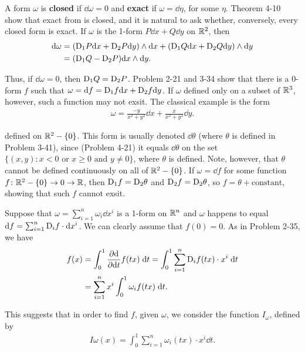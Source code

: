 A form $\omega$ is \textbf{closed} if $\dd\omega = 0$ and \textbf{exact} if $\omega=\dd\eta$,
for some $\eta$. Theorem 4-10 show that exact from is closed, and it is natural to ask whether,
conversely, every closed form is exact. If $\omega$ is the 1-form $P\dd x + Q\dd y$ on $\mathbb{R}^2$, 
then 
\begin{align*}
    \mathrm{d}\omega
    & = (\mathrm{D}_1P\mathrm{d} x + \mathrm{D}_2P\mathrm{d} y)\wedge\mathrm{d} x + (\mathrm{D}_1Q\mathrm{d} x + \mathrm{D}_2Q\mathrm{d} y)\wedge\mathrm{d} y \\
    & = (\mathrm{D}_1Q - \mathrm{D}_2P)\mathrm{d} x\wedge\mathrm{d} y.
\end{align*}

Thus, if $\dd\omega=0$, then $\mathrm{D}_1Q = \mathrm{D}_2P$. Problem 2-21 and 3-34 show that there is 
a 0-form $f$ such that $\omega=\mathrm{d} f=\mathrm{D}_1f\mathrm{d} x+ \mathrm{D}_2f\mathrm{d} y$. If $\omega$ defined only 
on a subset of $\mathbb{R}^3$, however, such a function may not exsit. The classical example is the 
form 
\begin{align*}
  \omega = \frac{-y}{x^2+y^2}\dd x + \frac{x}{x^2+y^2}\dd y.
\end{align*}

defined on $\mathbb{R}^2-\{0\}$. This form is usually denoted $\dd\theta$ (where $\theta$ is defined in Problem 3-41),
since (Problem 4-21) it equals $\dd\theta$ on the set $\{(x,y):x<0\text{ or } x\ge 0\text{ and }y\neq 0\}$,
where $\theta$ is defined. Note, however, that $\theta$ cannot be defined continuously on all of $\mathbb{R}^2-\{0\}$.
If $\omega=\dd f$ for some function $f\colon{}\mathbb{R}^2-\{0\}\to 0\to \mathbb{R}$, then $\mathrm{D}_1f = \mathrm{D}_2\theta$ and 
$\mathrm{D}_2f = \mathrm{D}_2\theta$, so $f=\theta + \text{constant}$, showing that such $f$ cannot exsit.

Suppose that $\omega=\sum_{i=1}^n\omega_i\dd x^i$ is a 1-form on $\mathbb{R}^n$ and $\omega$ happens to equal 
$\mathrm{d} f=\sum_{i=1}^{n}{\mathrm{D}_if\cdot \mathrm{d} x^i}$. We can clearly assume that $f(0)=0$. As in Problem 2-35, we have 
\begin{align*}
    f(x) 
    & = \int_{0}^{1}{\frac{\partial \mathrm{d} }{\partial \mathrm{d} t }f(tx) \;\mathrm{d} t}
        = \int_{0}^{1}{\sum_{i=1}^{n}{\mathrm{D}_i f(tx)\cdot x^i \;\mathrm{d} t}} \\
    & = \sum_{i=1}^{n}{x^i\int_{0}^{1}{\omega_i f(tx)\;\mathrm{d} t}}.
\end{align*}

This suggests that in order to find $f$, given $\omega$, we consider the
function $I_\omega$, defined by 
\begin{align*}
  I\omega(x)=\int_0^1\sum_{i=1}^n\omega_i(tx)\cdot x^i\dd t.
\end{align*}

